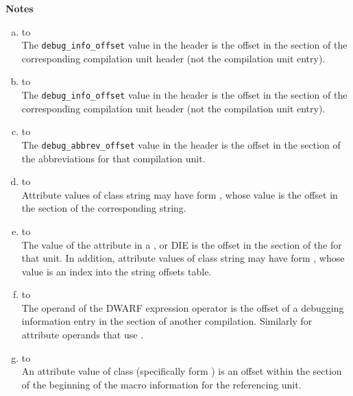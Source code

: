 \clearpage
\begin{center}
   \textbf{Notes}
\end{center}
\begin{enumerate}[(a)]  
\item  \dotdebugaranges{} to \dotdebuginfo \\
The \texttt{debug\_info\_offset} value in
the header is
the offset in the \dotdebuginfo{} section of the
corresponding compilation unit header (not the compilation
unit entry).

\item \dotdebugnames{} to \dotdebuginfo \\
The \texttt{debug\_info\_offset} value in the header is the offset in the
\dotdebuginfo{} section of the 
corresponding compilation unit header (not
the compilation unit entry). 

\item \dotdebuginfo{} to \dotdebugabbrev \\
The \texttt{debug\_abbrev\_offset} value in the header is the offset in the
\dotdebugabbrev{} 
section of the abbreviations for that compilation unit.

\item  \dotdebuginfo{} to \dotdebugstr \\
Attribute values of class string may have form 
\DWFORMstrp, whose
value is the offset in the \dotdebugstr{}
section of the corresponding string.

\item \dotdebuginfo{} to \dotdebugstroffsets \\
The value of the \DWATstroffsetsbase{} attribute in a
\DWTAGcompileunit{}, \DWTAGtypeunit{} or \DWTAGpartialunit{} 
DIE is the offset in the
\dotdebugstroffsets{} section of the 
for that unit.
In addition, attribute values of class string may have form 
\DWFORMstrx, whose value is an index into the
string offsets table.

\item \dotdebuginfo{} to \dotdebuginfo \\
The operand of the \DWOPcallref{} 
DWARF expression operator is the
offset of a debugging information entry in the 
\dotdebuginfo{} section of another compilation.
Similarly for attribute operands that use
\DWFORMrefaddr.

\item \dotdebuginfo{} to \dotdebugmacro \\
An attribute value of class 
 (specifically form
\DWFORMsecoffset) is an 
offset within the 
\dotdebugmacro{} section
of the beginning of the macro information for the referencing unit.


\end{enumerate}
